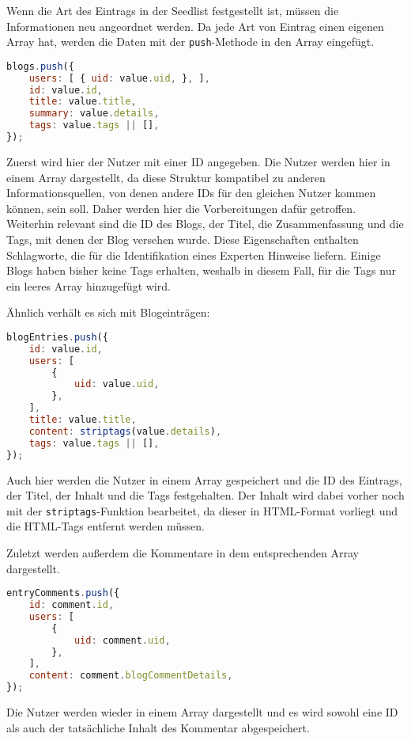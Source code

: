 Wenn die Art des Eintrags in der Seedlist festgestellt ist, müssen die Informationen neu angeordnet werden. Da jede Art von Eintrag einen eigenen Array hat, werden die Daten mit der \texttt{push}-Methode in den Array eingefügt. \\

\begin{lstlisting}[title=Struktur von Informationen über einen Blog, language=JavaScript]
blogs.push({
	users: [ { uid: value.uid, }, ],
	id: value.id,
	title: value.title,
	summary: value.details,
	tags: value.tags || [],
});
\end{lstlisting}

Zuerst wird hier der Nutzer mit einer ID angegeben. Die Nutzer werden hier in einem Array dargestellt, da diese Struktur kompatibel zu anderen Informationsquellen, von denen andere IDs für den gleichen Nutzer kommen können, sein soll. Daher werden hier die Vorbereitungen dafür getroffen. Weiterhin relevant sind die ID des Blogs, der Titel, die Zusammenfassung und die Tags, mit denen der Blog versehen wurde. Diese Eigenschaften enthalten Schlagworte, die für die Identifikation eines Experten Hinweise liefern. Einige Blogs haben bisher keine Tags erhalten, weshalb in diesem Fall, für die Tags nur ein leeres Array hinzugefügt wird.

Ähnlich verhält es sich mit Blogeinträgen: \\

\begin{lstlisting}[title=Struktur von Informationen über einen Blogeintrag, language=JavaScript]
blogEntries.push({
	id: value.id,
	users: [
		{
			uid: value.uid,
		},
	],
	title: value.title,
	content: striptags(value.details),
	tags: value.tags || [],
});
\end{lstlisting}

Auch hier werden die Nutzer in einem Array gespeichert und die ID des Eintrags, der Titel, der Inhalt und die Tags festgehalten. Der Inhalt wird dabei vorher noch mit der \texttt{striptags}-Funktion bearbeitet, da dieser in \ac{HTML}-Format vorliegt und die \ac{HTML}-Tags entfernt werden müssen.

Zuletzt werden außerdem die Kommentare in dem entsprechenden Array dargestellt. \\

\noindent
\begin{minipage}{\linewidth}
\begin{lstlisting}[title=Struktur von Informationen über einen Kommentar, language=JavaScript]
entryComments.push({
	id: comment.id,
	users: [
		{
			uid: comment.uid,
		},
	],
	content: comment.blogCommentDetails,
});
\end{lstlisting}
\end{minipage}

Die Nutzer werden wieder in einem Array dargestellt und es wird sowohl eine ID als auch der tatsächliche Inhalt des Kommentar abgespeichert.

